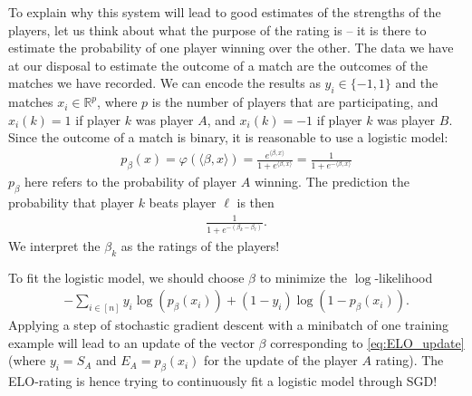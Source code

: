\documentclass{article}
\newcommand{\sprod}[1]{\langle #1 \rangle}
\newcommand{\R}{\mathbb{R}}
\begin{document}
To explain why this system will lead to good estimates of the strengths of the players, let us think about what the purpose of the rating is -- it is there to estimate the probability of one player winning over the other. The data we have at our disposal to estimate the outcome of a match are the outcomes of the matches we have recorded. We can encode the results as $y_i \in \{-1,1\}$ and the matches $x_i \in \R^p$, where $p$ is the number of players that are participating, and $x_i(k)=1$ if player $k$ was player $A$, and $x_i(k)=-1$ if player $k$ was player $B$. Since the outcome of a match is binary, it is reasonable to use a logistic model:
\begin{align*}
    p_\beta(x) = \varphi(\sprod{\beta,x}) =  \frac{e^{\sprod{\beta,x}}}{1+e^{\sprod{\beta,x}}} = \frac{1}{1+e^{-\sprod{\beta,x}}}
\end{align*}
$p_\beta$ here refers to the probability of player $A$ winning.
The prediction the probability that player $k$ beats player $\ell$ is then
\begin{align*}
    \frac{1}{1+e^{-(\beta_k-\beta_\ell)}}.
\end{align*}
We interpret the $\beta_k$ as the ratings of the players!

To fit the logistic model, we should choose $\beta$ to minimize the $\log$-likelihood
\begin{align*}
    -\sum_{i \in [n]} y_i \log(p_\beta(x_i)) + (1-y_i) \log(1-p_\beta(x_i)).
\end{align*}
Applying a step of stochastic gradient descent with a minibatch of one training example will lead to an update of the vector $\beta$ corresponding to \eqref{eq:ELO_update} (where $y_i=S_A$ and $E_A=p_\beta(x_i)$ for the update of the player $A$ rating). The ELO-rating is hence trying to continuously fit a logistic model through SGD!
\end{document}
